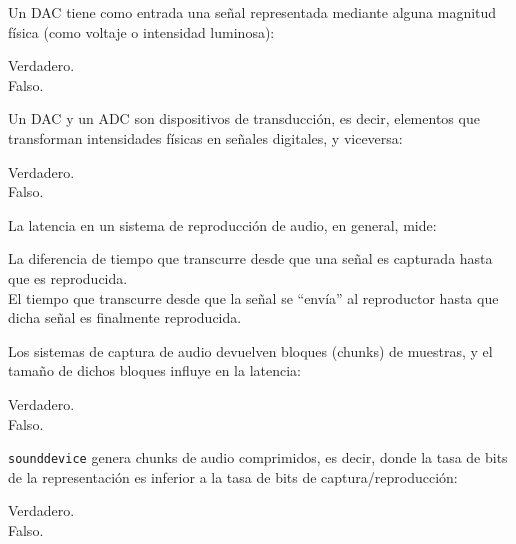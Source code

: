 \documentclass[legalpaper, 12pt, addpoints]{exam}
\begin{document}
\begin{questions}
\question Un DAC tiene como entrada una señal representada mediante
alguna magnitud física (como voltaje o intensidad luminosa):

\begin{oneparchoices}
  \choice Verdadero.\\
  \choice Falso.
\end{oneparchoices}
  
\vspace{0.10in}

\question Un DAC y un ADC son dispositivos de transducción, es decir,
elementos que transforman intensidades físicas en señales digitales, y
viceversa:

\begin{oneparchoices}
  \choice Verdadero.\\
  \choice Falso.
\end{oneparchoices}
  
\vspace{0.10in}

\question La latencia en un sistema de reproducción de audio, en general, mide:

\begin{oneparchoices}
  \choice La diferencia de tiempo que transcurre desde que una señal es capturada hasta que es reproducida.\\
  \choice El tiempo que transcurre desde que la señal se ``envía'' al
  reproductor hasta que dicha señal es finalmente reproducida.
\end{oneparchoices}
  
\vspace{0.10in}

\question Los sistemas de captura de audio devuelven bloques (chunks)
de muestras, y el tamaño de dichos bloques influye en la latencia:

\begin{oneparchoices}
  \choice Verdadero.\\
  \choice Falso.
\end{oneparchoices}
  
\vspace{0.10in}

\question \texttt{sounddevice} genera chunks de audio comprimidos, es
decir, donde la tasa de bits de la representación es inferior a la
tasa de bits de captura/reproducción:

\begin{oneparchoices}
  \choice Verdadero.\\
  \choice Falso.
\end{oneparchoices}
  
\vspace{0.10in}




\end{questions}
\end{document}
